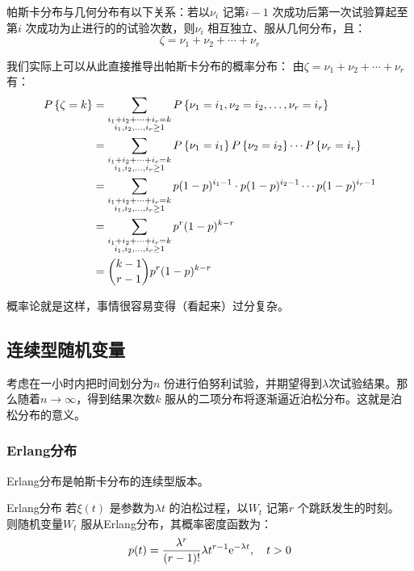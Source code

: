 帕斯卡分布与几何分布有以下关系：若以\(\nu_{i}\) 记第\(i-1\) 次成功后第一次试验算起至第\(i\)
次成功为止进行的的试验次数，则\(\nu_{i}\) 相互独立、服从几何分布，且：
\[
    \zeta = \nu_{1} + \nu_{2} + \cdots + \nu_{r}
\]

我们实际上可以从此直接推导出帕斯卡分布的概率分布：
由\(\zeta = \nu_{1} + \nu_{2} + \cdots + \nu_{r}\) 有：
\begin{align*}
    \P{\zeta=k} &=
    \sum_{\substack{i_{1}+i_{2}+\dots +i_{r}=k
    \\ i_{1},i_{2},\ldots,i_{r}\geq 1}} \P{\nu_{1}=i_{1},
    \nu_{2}=i_{2}, \ldots, \nu_{r}=i_{r}} \\
    &=\sum_{\substack{i_{1}+i_{2}+\dots +i_{r}=k
    \\ i_{1},i_{2},\ldots,i_{r}\geq 1}} P\left\{
    \nu_{1}=i_{1}\right\} \P{ \nu_{2}=i_{2} }
    \cdots \P{ \nu_{r}=i_{r} } \\
    &= \sum_{\substack{i_{1}+i_{2}+\dots +i_{r}=k
    \\ i_{1},i_{2},\ldots,i_{r}\geq 1}} p(1-p)^{i_{1}-1}
    \cdot p(1-p)^{i_{2}-1} \cdots p(1-p)^{i_{r}-1} \\
    &= \sum_{\substack{i_{1}+i_{2}+\dots +i_{r}=k
    \\ i_{1},i_{2},\ldots,i_{r}\geq 1}} p^{r} (1-p)^{k-r} \\
    &= \binom{k-1}{r-1} p^{r} (1-p)^{k-r}
\end{align*}

概率论就是这样，事情很容易变得（看起来）过分复杂。

\subsection{连续型随机变量}
考虑在一小时内把时间划分为\(n\) 份进行伯努利试验，并期望得到\(\lambda\)次试验结果。那么随着\(n
\to \infty\)，得到结果次数\(k\) 服从的二项分布将逐渐逼近泊松分布。这就是泊松分布的意义。

\subsubsection{Erlang分布} Erlang分布是帕斯卡分布的连续型版本。
\begin{definition}{Erlang分布}
    若\(\xi(t)\) 是参数为\(\lambda t\) 的泊松过程，以\(W_{t}\) 记第\(r\) 个跳跃发生的时刻。
    则随机变量\(W_{t}\) 服从Erlang分布，其概率密度函数为：
    \[
        p(t) = \frac{\lambda^{r}}{(r-1)!} \lambda t^{r-1}
        \e^{-\lambda t},
        \quad t>0
    \]
\end{definition}

